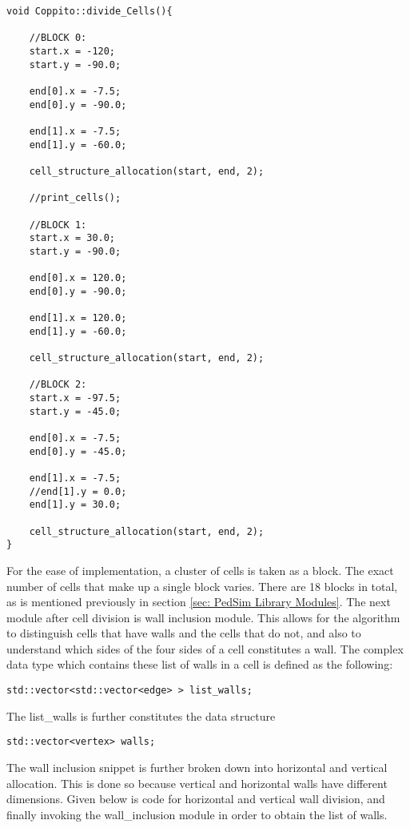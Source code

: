 \begin{lstlisting}
void Coppito::divide_Cells(){

	//BLOCK 0:
	start.x = -120;
	start.y = -90.0;

	end[0].x = -7.5;
	end[0].y = -90.0;

	end[1].x = -7.5;
	end[1].y = -60.0;

	cell_structure_allocation(start, end, 2);

	//print_cells();

	//BLOCK 1:
	start.x = 30.0;
	start.y = -90.0;

	end[0].x = 120.0;
	end[0].y = -90.0;

	end[1].x = 120.0;
	end[1].y = -60.0;

	cell_structure_allocation(start, end, 2);

	//BLOCK 2:
	start.x = -97.5;
	start.y = -45.0;

	end[0].x = -7.5;
	end[0].y = -45.0;

	end[1].x = -7.5;
	//end[1].y = 0.0;
	end[1].y = 30.0;

	cell_structure_allocation(start, end, 2);
}
\end{lstlisting}

For the ease of implementation, a cluster of cells is taken as a block. The exact number of cells that make up a single block varies. There are 18 blocks in total, as is mentioned previously in section \ref{sec: PedSim Library Modules}.
The next module after cell division is wall inclusion module. This allows for the algorithm to distinguish cells that have walls and the cells that do not, and also to understand which sides of the four sides of a cell constitutes a wall. The complex data type which contains these list of walls in a cell is defined as the following:

\begin{lstlisting}
std::vector<std::vector<edge> > list_walls;
\end{lstlisting}       

The list\_walls is further constitutes the data structure
\begin{lstlisting}
std::vector<vertex> walls;
\end{lstlisting}

The wall inclusion snippet is further broken down into horizontal and vertical allocation. This is done so because vertical and horizontal walls have different dimensions. Given below is code for horizontal and vertical wall division, and finally invoking the wall\_inclusion module in order to obtain the list of walls.

